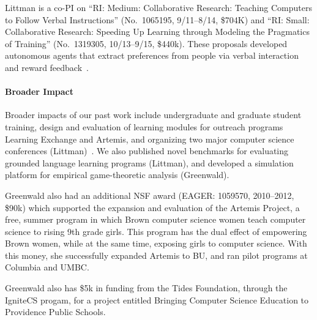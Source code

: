 Littman is a co-PI on ``RI: Medium: Collaborative Research: Teaching
Computers to Follow Verbal Instructions'' (No.\ 1065195, 9/11--8/14,
\$704K) and ``RI: Small: Collaborative Research: Speeding Up Learning
through Modeling the Pragmatics of Training'' (No.\ 1319305,
10/13--9/15, \$440k). These proposals developed autonomous agents that
extract preferences from people via verbal interaction and reward
feedback~\cite{loftin14b,macglashan15,macglashan15b}.

\vspace{\up}
\paragraph{Broader Impact}

Broader impacts of our past work include undergraduate and graduate
student training, design and evaluation of learning modules for
outreach programs Learning Exchange and Artemis, and organizing two
major computer science conferences (Littman)~\cite{desjardins13}.
We also published novel benchmarks for evaluating grounded language
learning programs (Littman), and developed a simulation platform for
empirical game-theoretic analysis (Greenwald).

Greenwald also had an additional NSF award (EAGER: 1059570,
2010--2012, \$90k) which supported the expansion and evaluation of the
Artemis Project, a free, summer program in which Brown computer
science women teach computer science to rising 9th grade girls.  This
program has the dual effect of empowering Brown women, while at the
same time, exposing girls to computer science.  With this money, she
successfully expanded Artemis to BU, and ran pilot programs at
Columbia and UMBC.

Greenwald also has \$5k in funding from the Tides Foundation, through
the IgniteCS progam, for a project entitled Bringing Computer Science
Education to Providence Public Schools.

